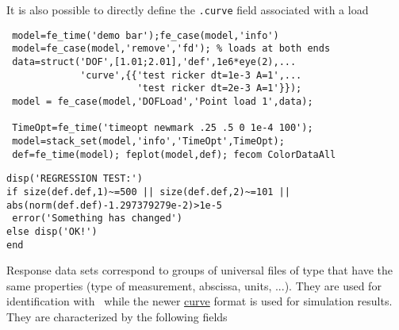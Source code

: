 It is also possible to directly define the {\tt .curve} field associated with a load

\begin{verbatim}
 model=fe_time('demo bar');fe_case(model,'info')
 model=fe_case(model,'remove','fd'); % loads at both ends
 data=struct('DOF',[1.01;2.01],'def',1e6*eye(2),...
             'curve',{{'test ricker dt=1e-3 A=1',...
                       'test ricker dt=2e-3 A=1'}});
 model = fe_case(model,'DOFLoad','Point load 1',data);

 TimeOpt=fe_time('timeopt newmark .25 .5 0 1e-4 100');
 model=stack_set(model,'info','TimeOpt',TimeOpt);
 def=fe_time(model); feplot(model,def); fecom ColorDataAll
\end{verbatim}%

\begin{SDTDEV}
\begin{verbatim}
disp('REGRESSION TEST:')
if size(def.def,1)~=500 || size(def.def,2)~=101 || abs(norm(def.def)-1.297379279e-2)>1e-5
 error('Something has changed')
else disp('OK!')
end
\end{verbatim}%
\end{SDTDEV}


Response data sets  correspond to groups of universal files of type  that have the same properties (type of measurement, abscissa, units, ...). They are used for identification with \idcom\ while the newer \hyperlink{curve}{curve} format is used for simulation results. They are characterized by the following fields

